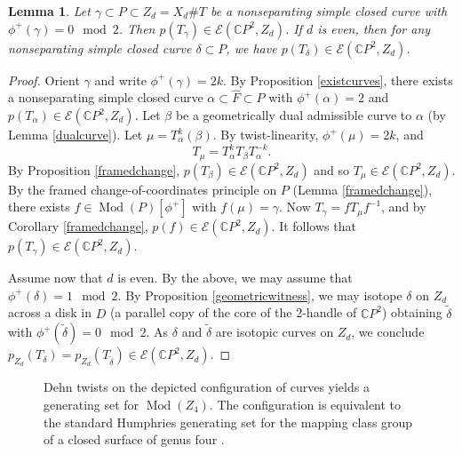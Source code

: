 \documentclass[10pt]{amsart}
\numberwithin{equation}{section}
\theoremstyle{plain}
\newtheorem{lemma}[theorem]{Lemma}
\theoremstyle{definition}
\theoremstyle{remark}
\DeclareMathOperator{\Mod}{Mod}
\begin{document}
\begin{lemma}\label{untwist}
Let $\gamma \subset P \subset Z_d = X_d \# T$ be a nonseparating simple closed curve with $\phi^+(\gamma) = 0 \mod 2$.  Then $p(T_{\gamma})\in \mathcal{E}(\mathbb{C}P^2,Z_d)$. If $d$ is even, then for any nonseparating simple closed curve $\delta \subset P$, we have $p(T_\delta) \in \mathcal{E}(\mathbb{C}P^2,Z_d)$.  
\end{lemma}

\begin{proof}
Orient $\gamma$ and write $\phi^+(\gamma) = 2k$. By Proposition \ref{existcurves},  there exists a nonseparating simple closed curve $\alpha \subset \widehat{F} \subset P$ with $\phi^+(\alpha) = 2$ and $p(T_{\alpha}) \in \mathcal{E}(\mathbb{C}P^2,Z_d)$. Let $\beta$ be a geometrically dual admissible curve to $\alpha$ (by Lemma \ref{dualcurve}). Let $\mu = T^k_\alpha(\beta)$. By twist-linearity, $\phi^+(\mu) = 2k$, and \[T_{\mu} = T_{\alpha}^k T_\beta T_{\alpha}^{-k}.\]By Proposition \ref{framedchange}, $p(T_\beta) \in \mathcal{E}(\mathbb{C}P^2,Z_d)$ and so $T_\mu \in \mathcal{E}(\mathbb{C}P^2,Z_d)$. By the framed change-of-coordinates principle on $P$ (Lemma \ref{framedchange}), there exists $f \in \Mod(P)[\phi^+]$ with $f(\mu) = \gamma$. Now $T_{\gamma} = fT_{\mu}f^{-1}$, and by Corollary \ref{framedchange},  $p(f) \in \mathcal{E}(\mathbb{C}P^2,Z_d)$. It follows that $p(T_{\gamma}) \in \mathcal{E}(\mathbb{C}P^2,Z_d)$.

Assume now that $d$ is even. By the above, we may assume that $\phi^+(\delta) = 1 \mod 2$. By Proposition \ref{geometricwitness}, we may isotope $\delta$ on $Z_d$ across a disk in $D$ (a parallel copy of the core of the 2-handle of $\mathbb{C}P^2$) obtaining  $\widetilde{\delta}$ with $\phi^+(\widetilde{\delta}) = 0 \mod 2$. As $\delta$ and $\widetilde{\delta}$ are isotopic curves on $Z_d$, we conclude $p_{Z_d}(T_\delta) = p_{Z_d}(T_{\widetilde{\delta}}) \in \mathcal{E}(\mathbb{C}P^2,Z_d)$. 
\end{proof}


\begin{figure}
  \centering
  \def\svgwidth{0.9\columnwidth}
  
  \caption{\textnormal{Dehn twists on the depicted configuration of curves yields a generating set for $\Mod(Z_4)$. The configuration is equivalent to the standard Humphries generating set for the mapping class group of a closed surface of genus four \cite{Primer}. }}
  \label{Degree4}
\end{figure}
\end{document}

